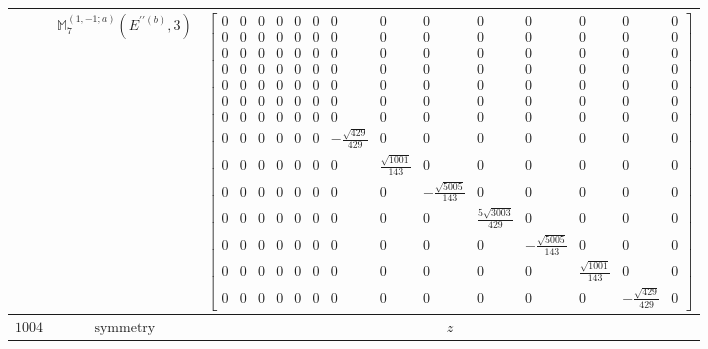 \documentclass[fleqn,8pt,landscape]{jsarticle}
\begin{document}
\begin{longtable}{ccc}
$  $ & $ \mathbb{M}_{7}^{(1,-1;a)}(E^{\prime\prime(b)},3) $ & $ \begin{bmatrix} 0 & 0 & 0 & 0 & 0 & 0 & 0 & 0 & 0 & 0 & 0 & 0 & 0 & 0 \\ 0 & 0 & 0 & 0 & 0 & 0 & 0 & 0 & 0 & 0 & 0 & 0 & 0 & 0 \\ 0 & 0 & 0 & 0 & 0 & 0 & 0 & 0 & 0 & 0 & 0 & 0 & 0 & 0 \\ 0 & 0 & 0 & 0 & 0 & 0 & 0 & 0 & 0 & 0 & 0 & 0 & 0 & 0 \\ 0 & 0 & 0 & 0 & 0 & 0 & 0 & 0 & 0 & 0 & 0 & 0 & 0 & 0 \\ 0 & 0 & 0 & 0 & 0 & 0 & 0 & 0 & 0 & 0 & 0 & 0 & 0 & 0 \\ 0 & 0 & 0 & 0 & 0 & 0 & 0 & 0 & 0 & 0 & 0 & 0 & 0 & 0 \\ 0 & 0 & 0 & 0 & 0 & 0 & - \frac{\sqrt{429}}{429} & 0 & 0 & 0 & 0 & 0 & 0 & 0 \\ 0 & 0 & 0 & 0 & 0 & 0 & 0 & \frac{\sqrt{1001}}{143} & 0 & 0 & 0 & 0 & 0 & 0 \\ 0 & 0 & 0 & 0 & 0 & 0 & 0 & 0 & - \frac{\sqrt{5005}}{143} & 0 & 0 & 0 & 0 & 0 \\ 0 & 0 & 0 & 0 & 0 & 0 & 0 & 0 & 0 & \frac{5 \sqrt{3003}}{429} & 0 & 0 & 0 & 0 \\ 0 & 0 & 0 & 0 & 0 & 0 & 0 & 0 & 0 & 0 & - \frac{\sqrt{5005}}{143} & 0 & 0 & 0 \\ 0 & 0 & 0 & 0 & 0 & 0 & 0 & 0 & 0 & 0 & 0 & \frac{\sqrt{1001}}{143} & 0 & 0 \\ 0 & 0 & 0 & 0 & 0 & 0 & 0 & 0 & 0 & 0 & 0 & 0 & - \frac{\sqrt{429}}{429} & 0 \end{bmatrix} $ \\ \hline
$ 1004 $ & $ \text{symmetry} $ & $ z $ \\

\end{longtable}
\end{document}
